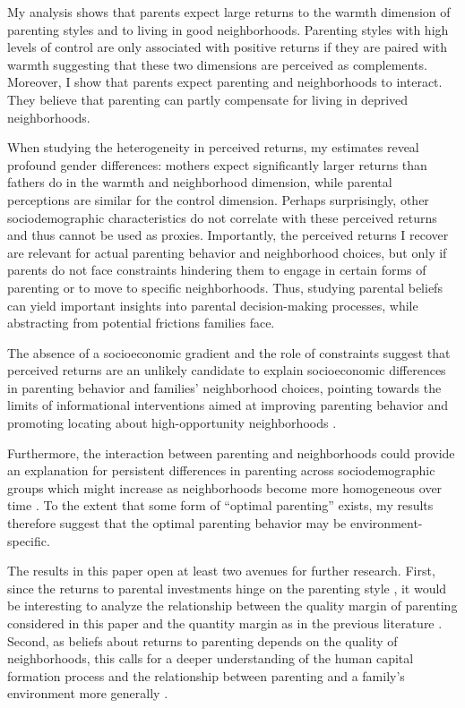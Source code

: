 \documentclass[12pt, a4paper, english]{article}
\begin{document}
My analysis shows that parents expect large returns to the warmth dimension of parenting styles and to living in good neighborhoods. Parenting styles with high levels of control are only associated with positive returns if they are paired with warmth suggesting that these two dimensions are perceived as complements. Moreover, I show that parents expect parenting and neighborhoods to interact. They believe that parenting can partly compensate for living in deprived neighborhoods.

When studying the heterogeneity in perceived returns, my estimates reveal profound gender differences: mothers expect significantly larger returns than fathers do in the warmth and neighborhood dimension, while parental perceptions are similar for the control dimension. Perhaps surprisingly, other sociodemographic characteristics do not correlate with these perceived returns and thus cannot be used as proxies. Importantly, the perceived returns I recover are relevant for actual parenting behavior and neighborhood choices, but only if parents do not face constraints hindering them to engage in certain forms of parenting or to move to specific neighborhoods. Thus, studying parental beliefs can yield important insights into parental decision-making processes, while abstracting from potential frictions families face.

The absence of a socioeconomic gradient and the role of constraints suggest that perceived returns are an unlikely candidate to explain socioeconomic differences in parenting behavior and families' neighborhood choices, pointing towards the limits of informational interventions aimed at improving parenting behavior and promoting locating about high-opportunity neighborhoods \citep[see also][]{Bergmannetal2020CMTO}. 

Furthermore, the interaction between parenting and neighborhoods could provide an explanation for persistent differences in parenting across sociodemographic groups which might increase as neighborhoods become more homogeneous over time \citep{putnam2016our}. To the extent that some form of ``optimal parenting'' exists, my results therefore suggest that the optimal parenting behavior may be environment-specific. 

The results in this paper open at least two avenues for further research. First, since the returns to parental investments hinge on the parenting style \citep{Cunha2015}, it would be interesting to analyze the relationship between the quality margin of parenting considered in this paper and the quantity margin as in the previous literature \citep{BonevaRauh2018,Bhalotraetal2017,Attanasioetal2018}. Second, as beliefs about returns to parenting depends on the quality of neighborhoods, this calls for a deeper understanding of the human capital formation process and the relationship between parenting and a family's environment more generally \citep[as, e.g., in][]{Agostinellietal2020}. 
\end{document}
